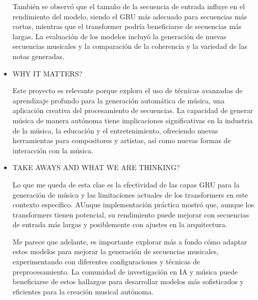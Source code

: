 \documentclass[letter, 11pt, twoside]{report}
\begin{document}
\begin{itemize}
    También se observó que el tamaño de la secuencia de entrada influye en el rendimiento del modelo, siendo el GRU más adecuado para secuencias más cortas, mientras que el transformer podría beneficiarse de secuencias más largas. La evaluación de los modelos incluyó la generación de nuevas secuencias musicales y la comparación de la coherencia y la variedad de las notas generadas.
    \item WHY IT MATTERS?
    
    Este proyecto es relevante porque explora el uso de técnicas avanzadas de aprendizaje profundo para la generación automática de música, una aplicación creativa del procesamiento de secuencias. La capacidad de generar música de manera autónoma tiene implicaciones significativas en la industria de la música, la educación y el entretenimiento, ofreciendo nuevas herramientas para compositores y artistas, así como nuevas formas de interacción con la música.
    \item TAKE AWAYS AND WHAT WE ARE THINKING?
    
    Lo que me queda de esta clae es la efectividad de las capas GRU para la generación de música y las limitaciones actuales de los transformers en este contexto específico.
    AUnque implementación práctica mostró que, aunque los transformers tienen potencial, su rendimiento puede mejorar con secuencias de entrada más largas y posiblemente con ajustes en la arquitectura. 

    Me parece que adelante, es importante explorar más a fondo cómo adaptar estos modelos para mejorar la generación de secuencias musicales, experimentando con diferentes configuraciones y técnicas de preprocesamiento. La comunidad de investigación en IA y música puede beneficiarse de estos hallazgos para desarrollar modelos más sofisticados y eficientes para la creación musical autónoma.
\end{itemize}
\end{document}
